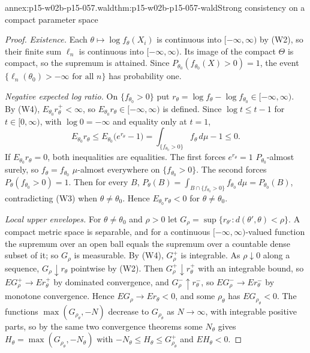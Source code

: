 \begin{annexitem}{annex:p15-w02b-p15-057.wald}{thm:p15-w02b-p15-057-wald}{Strong consistency on a compact parameter space}
\begin{proof}
\emph{Existence.} Each \(\theta\mapsto\log f_\theta(X_i)\) is continuous
into \([-\infty,\infty)\) by (W2), so their finite sum \(\ell_n\) is
continuous into \([-\infty,\infty)\). Its image of the compact \(\Theta\)
is compact, so the supremum is attained. Since
\(P_{\theta_0}(f_{\theta_0}(X)>0)=1\), the event
\(\{\ell_n(\theta_0)>-\infty\text{ for all }n\}\) has probability one.

\emph{Negative expected log ratio.} On \(\{f_{\theta_0}>0\}\) put
\(r_\theta=\log f_\theta-\log f_{\theta_0}\in[-\infty,\infty)\). By (W4),
\(E_{\theta_0}r_\theta^+<\infty\), so \(E_{\theta_0}r_\theta\in[-\infty,
\infty)\) is defined. Since \(\log t\leq t-1\) for \(t\in[0,\infty)\),
with \(\log0=-\infty\) and equality only at \(t=1\),
\[
 E_{\theta_0}r_\theta\leq E_{\theta_0}\bigl(e^{r_\theta}-1\bigr)
 =\int_{\{f_{\theta_0}>0\}}f_\theta\,d\mu-1\leq0 .
\]
If \(E_{\theta_0}r_\theta=0\), both inequalities are equalities. The first
forces \(e^{r_\theta}=1\) \(P_{\theta_0}\)-almost surely, so
\(f_\theta=f_{\theta_0}\) \(\mu\)-almost everywhere on
\(\{f_{\theta_0}>0\}\). The second forces
\(P_\theta(f_{\theta_0}>0)=1\). Then for every \(B\),
\(P_\theta(B)=\int_{B\cap\{f_{\theta_0}>0\}}f_{\theta_0}\,d\mu
=P_{\theta_0}(B)\), contradicting (W3) when \(\theta\neq\theta_0\).
Hence \(E_{\theta_0}r_\theta<0\) for \(\theta\neq\theta_0\).

\emph{Local upper envelopes.} For \(\theta\neq\theta_0\) and \(\rho>0\)
let \(G_\rho=\sup\{r_{\theta'}:d(\theta',\theta)<\rho\}\). A compact
metric space is separable, and for a continuous
\([-\infty,\infty)\)-valued function the supremum over an open ball equals
the supremum over a countable dense subset of it; so \(G_\rho\) is
measurable. By (W4), \(G_\rho^+\) is integrable. As \(\rho\downarrow0\)
along a sequence, \(G_\rho\downarrow r_\theta\) pointwise by (W2). Then
\(G_\rho^+\downarrow r_\theta^+\) with an integrable bound, so
\(E G_\rho^+\to Er_\theta^+\) by dominated convergence, and
\(G_\rho^-\uparrow r_\theta^-\), so \(EG_\rho^-\to Er_\theta^-\) by monotone
convergence. Hence \(EG_\rho\to Er_\theta<0\), and some \(\rho_\theta\)
has \(EG_{\rho_\theta}<0\). The functions
\(\max(G_{\rho_\theta},-N)\) decrease to \(G_{\rho_\theta}\) as
\(N\to\infty\), with integrable positive parts, so by the same two
convergence theorems some \(N_\theta\) gives
\(H_\theta=\max(G_{\rho_\theta},-N_\theta)\) with
\(-N_\theta\leq H_\theta\leq G_{\rho_\theta}^+\) and \(EH_\theta<0\).


\end{proof}
\end{annexitem}
